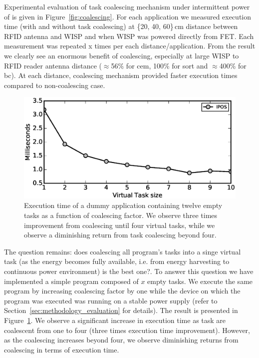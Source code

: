 Experimental evaluation of task coalescing mechanism under intermittent power of \sys is given in Figure~\ref{fig:coalescing}. For each application we measured execution time (with and without task coalescing) at \{20, 40, 60\}\,cm distance between RFID antenna and WISP and when WISP was powered directly from FET. Each measurement was repeated x times per each distance/application. From the result we clearly see an enormous benefit of coalescing, especially at large WISP to RFID reader antenna distance ($\approx$56\% for cem, 100\% for sort and $\approx$400\% for bc). At each distance, \sys coalescing mechanism provided faster execution times compared to non-coalescing case. 

\begin{figure}
	\centering
	\includegraphics[width=\columnwidth]{figures/virtualTaskSize.eps}
	\caption{Execution time of a dummy application containing twelve empty tasks as a function of coalescing factor. We observe three times improvement from coalescing until four virtual tasks, while we observe a diminishing return from task coalescing beyond four. }
	\label{fig:virtualTaskSize}
\end{figure}

The question remains: does coalescing all program's tasks into a singe virtual task (as the energy becomes fully available, i.e. from energy harvesting to continuous power environment) is the best one?. To answer this question we have implemented a simple program composed of $x$ empty tasks. We execute the same program by increasing coalescing factor by one while the device on which the program was executed was running on a stable power supply (refer to Section~\ref{sec:methodology_evaluation} for details). The result is presented in Figure~\ref{fig:virtualTaskSize}. We observe a significant increase in execution time as task are coalescent from one to four (three times execution time improvement). However, as the coalescing increases beyond four, we observe diminishing returns from coalescing in terms of execution time. 

